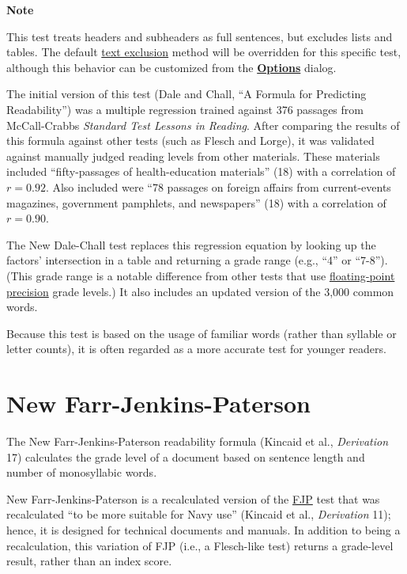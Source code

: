 \documentclass[
]{book}
\newenvironment{notesection}
    {
    \begin{tcolorbox}[colframe=mediumblue,colback=lightblue,coltext=mediumblue,arc=3mm]
    \faLightbulb[regular] \textbf{Note} \newline
    }
    {
    \end{tcolorbox}
    }
\theoremstyle{definition}
\theoremstyle{definition}
\theoremstyle{definition}
\theoremstyle{definition}
\theoremstyle{remark}
\begin{document}
\begin{notesection}
This test treats headers and subheaders as full sentences, but excludes lists and tables. The default \protect\hyperlink{options-text-exclusion}{text exclusion} method will be overridden for this specific test, although this behavior can be customized from the \protect\hyperlink{readability-test-options}{\textbf{Options}} dialog.

\end{notesection}

The initial version of this test (Dale and Chall, ``A Formula for Predicting Readability'') was a multiple regression trained against 376 passages from McCall-Crabbs \emph{Standard Test Lessons in Reading}. After comparing the results of this formula against other tests (such as Flesch and Lorge), it was validated against manually judged reading levels from other materials. These materials included ``fifty-passages of health-education materials'' (18) with a correlation of \(r = 0.92\). Also included were ``78 passages on foreign affairs from current-events magazines, government pamphlets, and newspapers'' (18) with a correlation of \(r = 0.90\).

The New Dale-Chall test replaces this regression equation by looking up the factors' intersection in a table and returning a grade range (e.g., ``4'' or ``7-8''). (This grade range is a notable difference from other tests that use \protect\hyperlink{grade-level-results}{floating-point precision} grade levels.) It also includes an updated version of the 3,000 common words.

Because this test is based on the usage of familiar words (rather than syllable or letter counts), it is often regarded as a more accurate test for younger readers.


\newpage

\hypertarget{new-farr-jenkins-paterson}{%
\section{\texorpdfstring{New Farr-Jenkins-Paterson}{New Farr-Jenkins-Paterson}}\label{new-farr-jenkins-paterson}}

The New Farr-Jenkins-Paterson readability formula (Kincaid et al., \emph{Derivation} 17) calculates the grade level of a document based on sentence length and number of monosyllabic words.

New Farr-Jenkins-Paterson is a recalculated version of the \protect\hyperlink{farr-jenkins-paterson}{FJP} test that was recalculated ``to be more suitable for Navy use'' (Kincaid et al., \emph{Derivation} 11); hence, it is designed for technical documents and manuals. In addition to being a recalculation, this variation of FJP (i.e., a Flesch-like test) returns a grade-level result, rather than an index score.
\end{document}
